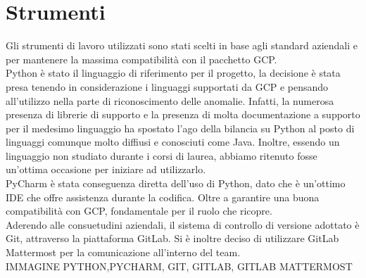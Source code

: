 \section{Strumenti}
Gli strumenti di lavoro utilizzati sono stati scelti in base agli standard aziendali e per mantenere la massima compatibilità con il pacchetto GCP.
\\
Python è stato il linguaggio di riferimento per il progetto, la decisione è stata presa tenendo in considerazione i linguaggi supportati da GCP e pensando all'utilizzo nella parte di riconoscimento delle anomalie. Infatti, la numerosa presenza di librerie di supporto e la presenza di molta documentazione a supporto per il medesimo linguaggio ha spostato l'ago della bilancia su Python al posto di linguaggi comunque molto diffiusi e conosciuti come Java. Inoltre, essendo un linguaggio non studiato durante i corsi di laurea, abbiamo ritenuto fosse un'ottima occasione per iniziare ad utilizzarlo.
\\
PyCharm è stata conseguenza diretta dell'uso di Python, dato che è un'ottimo IDE che offre assistenza durante la codifica. Oltre a garantire una buona compatibilità con GCP, fondamentale per il ruolo che ricopre.
\\
Aderendo alle consuetudini aziendali, il sistema di controllo di versione adottato è Git, attraverso la piattaforma GitLab. Si è inoltre deciso di utilizzare GitLab Mattermost per la comunicazione all'interno del team.
\\ IMMAGINE PYTHON,PYCHARM, GIT, GITLAB, GITLAB MATTERMOST